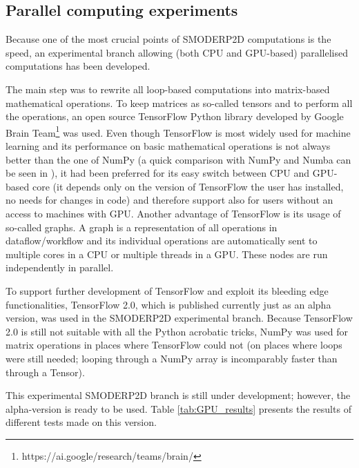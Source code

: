 \subsection{Parallel computing experiments}

Because one of the most crucial points of SMODERP2D computations is
the speed, an experimental branch allowing (both CPU and GPU-based)
parallelised computations has been developed.

The main step was to rewrite all loop-based computations into
matrix-based mathematical operations. To keep matrices as so-called
tensors and to perform all the operations, an open source  TensorFlow Python
library \cite{tensorflow2015-whitepaper} developed by Google Brain
Team\footnote{https://ai.google/research/teams/brain/} was used. Even though
TensorFlow is most widely used for machine learning
and its performance on basic mathematical operations is not always better
than the one of NumPy (a quick comparison with NumPy and Numba can be
seen in \cite{tf-np}), it had been preferred for its easy switch
between CPU and GPU-based core (it depends only on the version of
TensorFlow the user has installed, no needs for changes in code) and
therefore support also for users without an access to machines with
GPU. Another advantage of TensorFlow is its usage of so-called
graphs. A graph is a representation of all operations in
dataflow/workflow and its individual operations are automatically sent
to multiple cores in a CPU or multiple threads in a GPU. These nodes
are run independently in parallel.

To support further development of TensorFlow and exploit its bleeding
edge functionalities, TensorFlow 2.0, which is published currently
just as an alpha version, was used in the SMODERP2D experimental
branch. Because TensorFlow 2.0 is still not suitable with all the
Python acrobatic tricks, NumPy was used for matrix operations in
places where TensorFlow could not (on places where loops were still
needed; looping through a NumPy array is incomparably faster than
through a Tensor).

This experimental SMODERP2D branch is still under development;
however, the alpha-version is ready to be used. Table \ref{tab:GPU_results}
presents the results of different tests made on this version.

